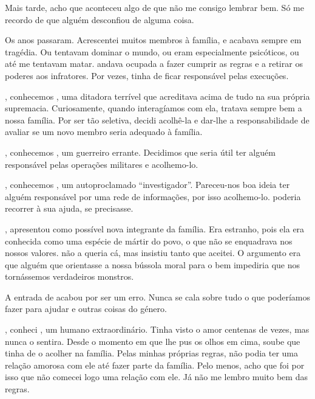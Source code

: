 {Mais tarde, acho que aconteceu algo de que não me consigo lembrar bem. Só me recordo de que alguém desconfiou de alguma coisa.

Os anos passaram. Acrescentei muitos membros à família, e acabava sempre em tragédia. Ou tentavam dominar o mundo, ou eram especialmente psicóticos, ou até me tentavam matar.  andava ocupada a fazer cumprir as regras e a retirar os poderes aos infratores. Por vezes,  tinha de ficar responsável pelas execuções.

, conhecemos , uma ditadora terrível que acreditava acima de tudo na sua própria supremacia. Curiosamente, quando interagíamos com ela, tratava sempre bem a nossa família. Por ser tão seletiva, decidi acolhê-la e dar-lhe a responsabilidade de avaliar se um novo membro seria adequado à família.

, conhecemos , um guerreiro errante. Decidimos que seria útil ter alguém responsável pelas operações militares e acolhemo-lo.

, conhecemos , um autoproclamado ``investigador''. Pareceu-nos boa ideia ter alguém responsável por uma rede de informações, por isso acolhemo-lo.  poderia recorrer à sua ajuda, se precisasse.

,  apresentou  como possível nova integrante da família. Era estranho, pois ela era conhecida como uma espécie de mártir do povo, o que não se enquadrava nos nossos valores.  não a queria cá, mas  insistiu tanto que aceitei. O argumento era que alguém que orientasse a nossa bússola moral para o bem impediria que nos tornássemos verdadeiros monstros.

A entrada de  acabou por ser um erro. Nunca se cala sobre tudo o que poderíamos fazer para ajudar e outras coisas do género.

, conheci , um humano extraordinário. Tinha visto o amor centenas de vezes, mas nunca o sentira. Desde o momento em que lhe pus os olhos em cima, soube que tinha de o acolher na família. Pelas minhas próprias regras, não podia ter uma relação amorosa com ele até fazer parte da família. Pelo menos, acho que foi por isso que não comecei logo uma relação com ele. Já não me lembro muito bem das regras.

}
